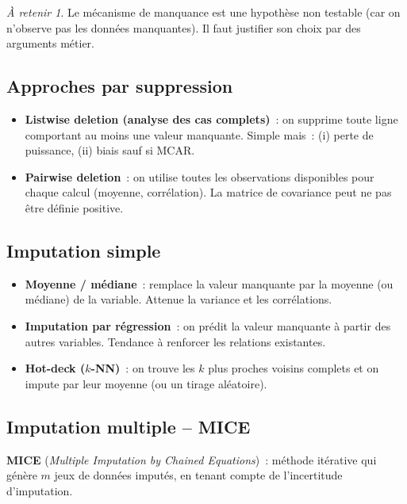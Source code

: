 \documentclass[a4paper,11pt]{article}
\theoremstyle{definition}
\theoremstyle{remark}
\newtheorem*{important}{À retenir}
\begin{document}
\begin{important}
  Le mécanisme de manquance est une hypothèse non testable
  (car on n'observe pas les données manquantes). Il faut justifier
  son choix par des arguments métier.
\end{important}

\subsection{Approches par suppression}

\begin{itemize}
  \item \textbf{Listwise deletion (analyse des cas complets)}~:
    on supprime toute ligne comportant au moins une valeur manquante.
    Simple mais~: (i) perte de puissance, (ii) biais sauf si MCAR.
  \item \textbf{Pairwise deletion}~: on utilise toutes les observations
    disponibles pour chaque calcul (moyenne, corrélation). La matrice de
    covariance peut ne pas être définie positive.
\end{itemize}

\subsection{Imputation simple}

\begin{itemize}
  \item \textbf{Moyenne / médiane}~: remplace la valeur manquante par la
    moyenne (ou médiane) de la variable. Attenue la variance et les
    corrélations.
  \item \textbf{Imputation par régression}~: on prédit la valeur manquante
    à partir des autres variables. Tendance à renforcer les relations
    existantes.
  \item \textbf{Hot-deck ($k$-NN)}~: on trouve les $k$ plus proches voisins
    complets et on impute par leur moyenne (ou un tirage aléatoire).
\end{itemize}

\subsection{Imputation multiple -- MICE}

\textbf{MICE} (\textit{Multiple Imputation by Chained Equations})~:
méthode itérative qui génère $m$ jeux de données imputés, en tenant
compte de l'incertitude d'imputation.
\end{document}
